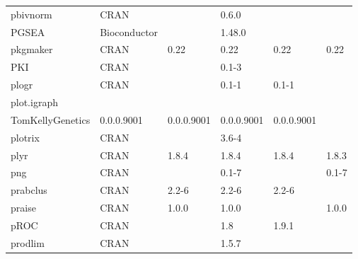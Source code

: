 \begin{longtable}{llllll}
\rowcolor{black!5}
pbivnorm                      & CRAN                      &             & 0.6.0       &                &                    \\
\rowcolor{black!10}
PGSEA                         & Bioconductor              &             & 1.48.0      &                &                   \\
\rowcolor{black!5}
pkgmaker                      & CRAN                      & 0.22        & 0.22        & 0.22           & 0.22               \\
\rowcolor{black!10}
PKI                           & CRAN                      &             & 0.1-3       &                &                   \\
\rowcolor{black!5}
plogr                         & CRAN                      &             & 0.1-1       & 0.1-1          &                    \\
\rowcolor{black!10}
plot.igraph                   & \begin{tabular}[c]{@{}l@{}}GitHub \\ TomKellyGenetics \end{tabular}  & 0.0.0.9001  & 0.0.0.9001  & 0.0.0.9001     & 0.0.0.9001        \\
\rowcolor{black!5}
plotrix                       & CRAN                      &             & 3.6-4       &                &                    \\
\rowcolor{black!10}
plyr                          & CRAN                      & 1.8.4       & 1.8.4       & 1.8.4          & 1.8.3             \\
\rowcolor{black!5}
png                           & CRAN                      &             & 0.1-7       &                & 0.1-7              \\
\rowcolor{black!10}
prabclus                      & CRAN                      & 2.2-6       & 2.2-6       & 2.2-6          &                   \\
\rowcolor{black!5}
praise                        & CRAN                      & 1.0.0       & 1.0.0       &                & 1.0.0              \\
\rowcolor{black!10}
pROC                          & CRAN                      &             & 1.8         & 1.9.1          &                   \\
\rowcolor{black!5}
prodlim                       & CRAN                      &             & 1.5.7       &                &                    \\

\end{longtable}
